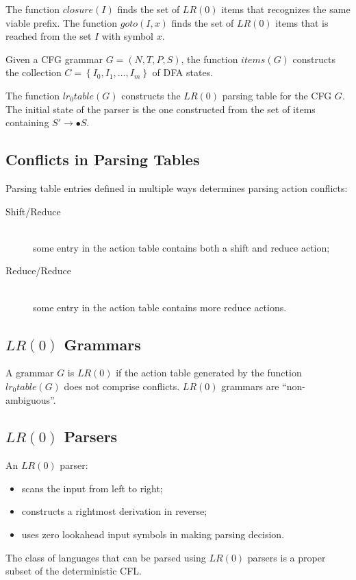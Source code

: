 The function $closure(I)$ finds the set of $LR(0)$ items that recognizes the same viable prefix.
The function $goto(I, x)$ finds the set of $LR(0)$ items that is reached from the set $I$ with symbol $x$.

Given a CFG grammar $G = (N, T, P, S)$, the function $items(G)$ constructs the collection $C = \left\{I_0, I_1, \ldots, I_m\right\}$ of DFA states.

The function $lr_0table(G)$ constructs the $LR(0)$ parsing table for the CFG $G$.
The initial state of the parser is the one constructed from the set of items containing $S' \to \bullet S$.

\subsection{Conflicts in Parsing Tables}
Parsing table entries defined in multiple ways determines parsing action conflicts:
\begin{description}
    \item[Shift/Reduce]\mbox{}\\
    some entry in the action table contains both a shift and reduce action;
    \item[Reduce/Reduce]\mbox{}\\
    some entry in the action table contains more reduce actions.
\end{description}

\subsection{$LR(0)$ Grammars}
A grammar $G$ is $LR(0)$ if the action table generated by the function $lr_0table(G)$ does not comprise conflicts.
$LR(0)$ grammars are ``non-ambiguous''.

\subsection{$LR(0)$ Parsers}
An $LR(0)$ parser:
\begin{itemize}
    \item scans the input from left to right;
    \item constructs a rightmost derivation in reverse;
    \item uses zero lookahead input symbols in making parsing decision.
\end{itemize}
The class of languages that can be parsed using $LR(0)$ parsers is a proper subset of the deterministic CFL.

